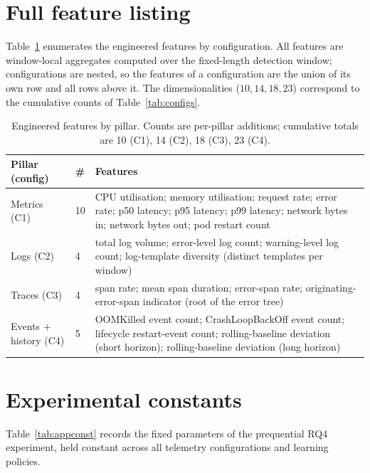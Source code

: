 \documentclass[acmsmall]{acmart}
\begin{document}



\appendix
\section{Full feature listing}\label{app:features}

Table~\ref{tab:appfeatures} enumerates the engineered features by configuration. All features are window-local aggregates computed over the fixed-length detection window; configurations are nested, so the features of a configuration are the union of its own row and all rows above it. The dimensionalities ($10, 14, 18, 23$) correspond to the cumulative counts of Table~\ref{tab:configs}.

\begin{table}[h]
\caption{Engineered features by pillar. Counts are per-pillar additions; cumulative totals are 10 (C1), 14 (C2), 18 (C3), 23 (C4).}\label{tab:appfeatures}
\begin{tabular}{@{}llp{}@{}}
\toprule
Pillar (config) & \# & Features \\
\midrule
Metrics (C1) & 10 & CPU utilisation; memory utilisation; request rate; error rate; p50 latency; p95 latency; p99 latency; network bytes in; network bytes out; pod restart count \\
Logs (C2)    & 4  & total log volume; error-level log count; warning-level log count; log-template diversity (distinct templates per window) \\
Traces (C3)  & 4  & span rate; mean span duration; error-span rate; originating-error-span indicator (root of the error tree) \\
Events ${+}$ history (C4) & 5 & OOMKilled event count; CrashLoopBackOff event count; lifecycle restart-event count; rolling-baseline deviation (short horizon); rolling-baseline deviation (long horizon) \\
\bottomrule
\end{tabular}
\end{table}

\section{Experimental constants}\label{app:constants}

Table~\ref{tab:appconst} records the fixed parameters of the prequential RQ4 experiment, held constant across all telemetry configurations and learning policies.
\end{document}
